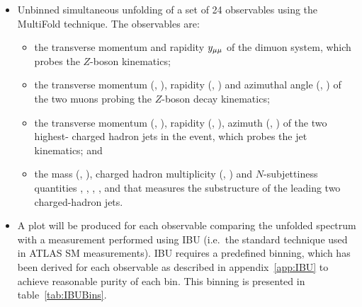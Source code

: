 \begin{itemize}
\item
  Unbinned simultaneous unfolding of a set of 24 observables using the MultiFold technique.
  The observables are:
  \begin{itemize}
    \item
      the transverse momentum \ptll{} and rapidity $y_{\mu\mu}$ of the dimuon system, which probes the $Z$-boson kinematics;
    \item
      the transverse momentum (\ptlm, \ptsm),
      rapidity (\ylm{}, \ysm) and azimuthal angle (\philm, \phism) of the two muons probing the $Z$-boson decay kinematics;
    \item
      the transverse momentum (\ptlj, \ptsj), rapidity (\ylj{}, \ysj), azimuth (\philj, \phisj) of the two highest-\pt{} charged hadron jets in the event, which probes the jet kinematics; and
    \item
      the mass (\mlj, \msj), charged hadron multiplicity (\Nclj, \Ncsj) and $N$-subjettiness quantities , %
      , , ,  and  that measures the substructure of the leading two charged-hadron jets.
  \end{itemize}
\item
   A plot will be produced for each observable comparing the unfolded spectrum with a measurement performed using IBU (i.e.\ the standard technique used in ATLAS SM measurements).
   IBU requires a predefined binning, which has been derived for each observable as described in appendix~\ref{app:IBU} to achieve reasonable purity of each bin.
   This binning is presented in table~\ref{tab:IBUBins}.


\end{itemize}
